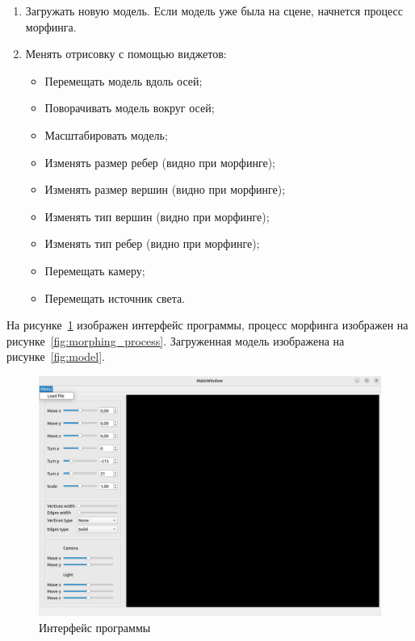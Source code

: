 \begin{enumerate}
	\item Загружать новую модель.
	Если модель уже была на сцене, начнется процесс морфинга.
	\item Менять отрисовку с помощью виджетов:
	
	\begin{itemize}
		\item Перемещать модель вдоль осей;
		\item Поворачивать модель вокруг осей;
		\item Масштабировать модель;
		\item Изменять размер ребер (видно при морфинге);
		\item Изменять размер вершин (видно при морфинге);
		\item Изменять тип вершин (видно при морфинге);
		\item Изменять тип ребер (видно при морфинге);
		\item Перемещать камеру;
		\item Перемещать источник света.
	\end{itemize}
\end{enumerate}

На рисунке~\ref{fig:interface} изображен интерфейс программы, процесс морфинга изображен на рисунке~\ref{fig:morphing_process}.
Загруженная модель изображена на рисунке~\ref{fig:model}.


\begin{figure}[h]
	\centering
	\includegraphics[scale=0.54]{images/interface_programm.png}
	\caption{Интерфейс программы}
	\label{fig:interface}
\end{figure}

